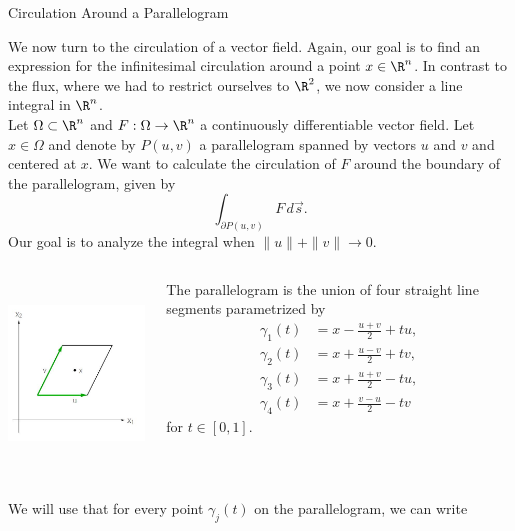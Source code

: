 \documentclass[smaller,hyperref={CJKbookmarks=true}]{beamer}
\begin{document}
\begin{frame}{Circulation Around a Parallelogram}
\begin{spacing}{1}
\vspace*{12pt}
We now turn to the circulation of a vector field. Again, our goal is to find
an expression for the infinitesimal circulation around a point $x\in\R^n$. In contrast to the flux, where we had to restrict ourselves to $\R^2$, we now consider a line integral in $\R^n$.\\[5pt]
Let $\Omega\subset\R^n$ and $F:\Omega\to\R^n$ a continuously dif{}ferentiable vector field. Let $x\in\Omega$ and denote by $P(u,v)$ a parallelogram spanned by vectors $u$ and $v$ and centered at $x$. We want to calculate the circulation of $F$ around the boundary of the parallelogram, given by
\[\int_{\partial P(u,v)}F\,d\vec{s}.\]
Our goal is to analyze the integral when $\|u\|+\|v\|\to0$.
\end{spacing}
\newpage
\begin{spacing}{1}
\begin{columns}[onlytextwidth]
\begin{column}{0.45\textwidth}
\includegraphics[width=\columnwidth,height=140pt]{90.jpg}
\end{column}
\begin{column}{0.55\textwidth}
The parallelogram is the union of four
straight line segments parametrized by
\begin{align*}
  \gamma_1(t) &=x-\frac{u+v}{2}+tu, \\
  \gamma_2(t) &=x+\frac{u-v}{2}+tv, \\
  \gamma_3(t) &=x+\frac{u+v}{2}-tu, \\
  \gamma_4(t) &=x+\frac{v-u}{2}-tv
\end{align*}
for $t\in[0,1]$.
\end{column}
\end{columns}
\vspace*{2pt}
We will use that for every point $\gamma_j(t)$ on the parallelogram, we can write

\end{spacing}
\end{frame}
\end{document}
